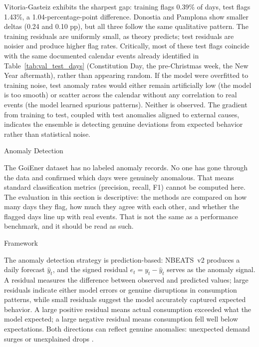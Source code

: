 ﻿\documentclass[12pt,reqno, twoside]{amsbook}
\makeatletter
\numberwithin{figure}{chapter}
\numberwithin{table}{chapter}
\numberwithin{equation}{chapter}
\def\section{\@startsection{section}{1}%
      \z@{.5\linespacing\@plus.7\linespacing}{.25\linespacing}%
      {\normalfont\bfseries\flushleft}}
\def\subsection{\@startsection{subsection}{2}%
      \z@{.5\linespacing\@plus.7\linespacing}{.25\linespacing}%
      {\normalfont\bfseries\flushleft}}
\theoremstyle{plain}
\numberwithin{equation}{chapter}
\numberwithin{section}{chapter}
\makeatother
\begin{document}
Vitoria-Gasteiz exhibits the sharpest gap: training flags 0.39\% of days, test flags 1.43\%, a 1.04-percentage-point difference. Donostia and Pamplona show smaller deltas (0.24 and 0.10 pp), but all three follow the same qualitative pattern. The training residuals are uniformly small, as theory predicts; test residuals are noisier and produce higher flag rates. Critically, most of these test flags coincide with the same documented calendar events already identified in Table~\ref{tab:val_test_days} (Constitution Day, the pre-Christmas week, the New Year aftermath), rather than appearing random. If the model were overfitted to training noise, test anomaly rates would either remain artificially low (the model is too smooth) or scatter across the calendar without any correlation to real events (the model learned spurious patterns). Neither is observed. The gradient from training to test, coupled with test anomalies aligned to external causes, indicates the ensemble is detecting genuine deviations from expected behavior rather than statistical noise.

\section{Anomaly Detection}
\label{sec:anomaly}

The GoiEner dataset has no labeled anomaly records. No one has gone through the data and confirmed which days were genuinely anomalous. That means standard classification metrics (precision, recall, F1) cannot be computed here. The evaluation in this section is descriptive: the methods are compared on how many days they flag, how much they agree with each other, and whether the flagged days line up with real events. That is not the same as a performance benchmark, and it should be read as such.

\subsection{Framework}
\label{subsec:anomaly_framework}

The anomaly detection strategy is prediction-based: \ac{NBEATS}~v2 produces a daily forecast $\hat{y}_t$, and the signed residual $e_t = y_t - \hat{y}_t$ serves as the anomaly signal. A residual measures the difference between observed and predicted values; large residuals indicate either model errors or genuine disruptions in consumption patterns, while small residuals suggest the model accurately captured expected behavior. A large positive residual means actual consumption exceeded what the model expected; a large negative residual means consumption fell well below expectations. Both directions can reflect genuine anomalies: unexpected demand surges or unexplained drops \cite{zangrando_anomaly_2022}.
\end{document}
